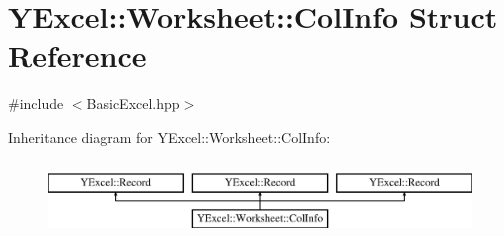 \hypertarget{struct_y_excel_1_1_worksheet_1_1_col_info}{}\section{Y\+Excel\+:\+:Worksheet\+:\+:Col\+Info Struct Reference}
\label{struct_y_excel_1_1_worksheet_1_1_col_info}


{\ttfamily \#include $<$Basic\+Excel.\+hpp$>$}

Inheritance diagram for Y\+Excel\+:\+:Worksheet\+:\+:Col\+Info\+:\begin{figure}[H]
\begin{center}
\leavevmode
\includegraphics[height=2.000000cm]{struct_y_excel_1_1_worksheet_1_1_col_info}
\end{center}
\end{figure}
